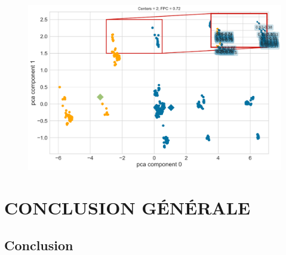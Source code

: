 \documentclass[aspectratio=169,professionalfonts, 12pt]{beamer}
\begin{document}

\begin{frame}
  \justifying
  \begin{minipage}{\textwidth}
    \begin{figure}[H]
      \begin{center}
        \includegraphics[scale=0.4]{images/contribution/fuzzy_partition_plot1.png}
      \end{center}
    \end{figure}
  \end{minipage}
\end{frame}

\section{CONCLUSION G\'EN\'ERALE}

\subsection{Conclusion}
\end{document}

